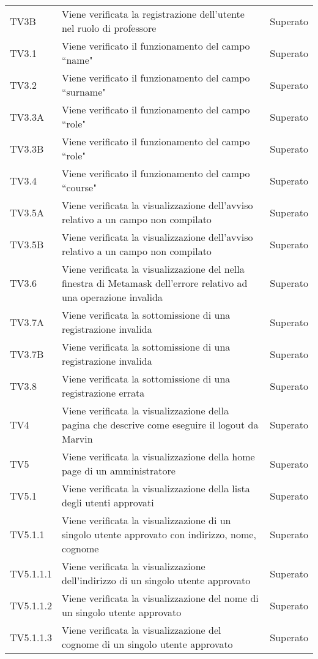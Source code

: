 \documentclass[PianoDiQualifica.tex]{subfiles}
\begin{document}
\begin{longtable}[H]{P{2cm}P{8.5cm}P{3cm}}
	TV3B & Viene verificata la registrazione dell'utente nel ruolo di professore & Superato \\ 
	TV3.1 & Viene verificato il funzionamento del campo ``name" & Superato \\ 
	TV3.2 & Viene verificato il funzionamento del campo ``surname" & Superato \\ 
	TV3.3A & Viene verificato il funzionamento del campo ``role" & Superato \\ 
	TV3.3B & Viene verificato il funzionamento del campo ``role" & Superato \\ 
	TV3.4 & Viene verificato il funzionamento del campo ``course" & Superato \\ 
	TV3.5A & Viene verificata la visualizzazione dell'avviso relativo a un campo non compilato & Superato \\ 
	TV3.5B & Viene verificata la visualizzazione dell'avviso relativo a un campo non compilato & Superato \\ 
	TV3.6 & Viene verificata la visualizzazione del nella finestra di Metamask dell'errore relativo ad una operazione invalida & Superato \\ 
	TV3.7A & Viene verificata la sottomissione di una registrazione invalida & Superato \\ 
	TV3.7B & Viene verificata la sottomissione di una registrazione invalida & Superato \\ 
	TV3.8 & Viene verificata la sottomissione di una registrazione errata & Superato \\ 
	TV4 & Viene verificata la visualizzazione della pagina che descrive come eseguire il logout da Marvin & Superato \\ 
	TV5 & Viene verificata la visualizzazione della home page di un amministratore & Superato \\ 
	TV5.1 & Viene verificata la visualizzazione della lista degli utenti approvati & Superato \\ 
	TV5.1.1 & Viene verificata la visualizzazione di un singolo utente approvato con indirizzo, nome, cognome & Superato \\ 
	TV5.1.1.1 & Viene verificata la visualizzazione dell'indirizzo di un singolo utente approvato & Superato \\ 
	TV5.1.1.2 & Viene verificata la visualizzazione del nome di un singolo utente approvato & Superato \\ 
	TV5.1.1.3 & Viene verificata la visualizzazione del cognome di un singolo utente approvato & Superato \\ 

\end{longtable}
\end{document}
